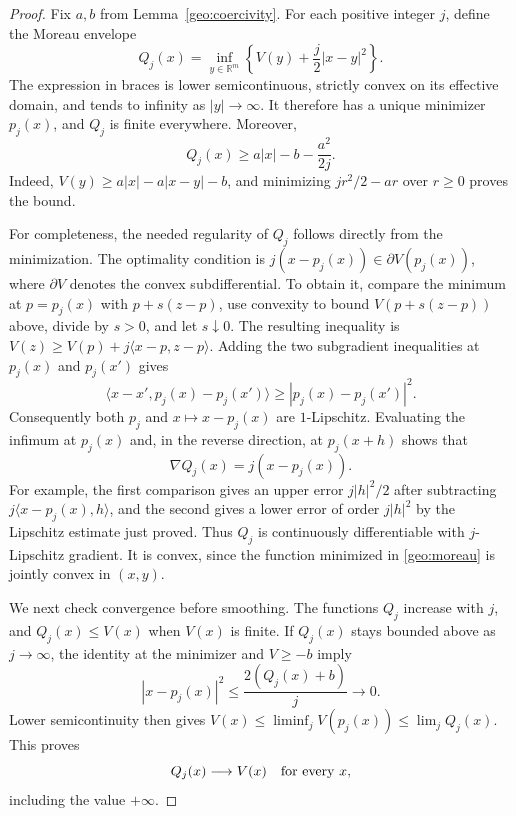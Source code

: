 \documentclass[11pt]{article}
\theoremstyle{definition}
\theoremstyle{remark}
\numberwithin{equation}{section}
\begin{document}
\begin{proof}
Fix $a,b$ from Lemma~\ref{geo:coercivity}.  For each positive integer $j$,
define the Moreau envelope \cite[Section~7]{Moreau1965}
\begin{equation}\label{geo:moreau}
  Q_j(x)=\inf_{y\in\mathbb R^m}\left\{V(y)+\frac j2|x-y|^2\right\}.
\end{equation}
The expression in braces is lower semicontinuous, strictly convex on its
effective domain, and tends to infinity as $|y|\to\infty$.  It therefore
has a unique minimizer $p_j(x)$, and $Q_j$ is finite everywhere.  Moreover,
\begin{equation}\label{geo:envelope-lower}
  Q_j(x)\geq a|x|-b-\frac{a^2}{2j}.
\end{equation}
Indeed, $V(y)\geq a|x|-a|x-y|-b$, and minimizing
$jr^2/2-ar$ over $r\geq0$ proves the bound.

For completeness, the needed regularity of $Q_j$ follows directly from
the minimization.  The optimality condition is
$j(x-p_j(x))\in\partial V(p_j(x))$, where $\partial V$ denotes the convex
subdifferential.  To obtain it, compare the minimum at $p=p_j(x)$ with
$p+s(z-p)$, use convexity to bound $V(p+s(z-p))$ above, divide by $s>0$,
and let $s\downarrow0$.  The resulting inequality is
$V(z)\geq V(p)+j\langle x-p,z-p\rangle$.
Adding the two subgradient inequalities at $p_j(x)$ and
$p_j(x')$ gives
\[
  \langle x-x',p_j(x)-p_j(x')\rangle
  \geq |p_j(x)-p_j(x')|^2.
\]
Consequently both $p_j$ and $x\mapsto x-p_j(x)$ are $1$-Lipschitz.
Evaluating the infimum at $p_j(x)$ and, in the reverse direction, at
$p_j(x+h)$ shows that
\[
  \nabla Q_j(x)=j(x-p_j(x)).
\]
For example, the first comparison gives an upper error $j|h|^2/2$
after subtracting $j\langle x-p_j(x),h\rangle$, and the second gives
a lower error of order $j|h|^2$ by the Lipschitz estimate just proved.
Thus $Q_j$ is continuously differentiable with $j$-Lipschitz gradient.
It is convex, since the function minimized in \eqref{geo:moreau} is jointly
convex in $(x,y)$.

We next check convergence before smoothing.  The functions $Q_j$ increase
with $j$, and $Q_j(x)\leq V(x)$ when $V(x)$ is finite.  If $Q_j(x)$ stays
bounded above as $j\to\infty$, the identity at the minimizer and $V\geq-b$
imply
\[
  |x-p_j(x)|^2\leq\frac{2(Q_j(x)+b)}j\longrightarrow0.
\]
Lower semicontinuity then gives
$V(x)\leq\liminf_j V(p_j(x))\leq\lim_jQ_j(x)$.
This proves
\begin{equation}\label{geo:envelope-limit}
  Q_j(x)\longrightarrow V(x)\quad\hbox{for every }x,
\end{equation}
including the value $+\infty$.


\end{proof}
\end{document}
